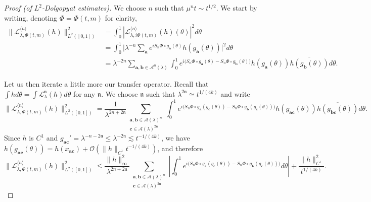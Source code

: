 \documentclass[11pt]{amsart}
\theoremstyle{plain}
\theoremstyle{definition}
\numberwithin{equation}{section}
\begin{document}
\begin{proof}[Proof (of $L^2$-Dolgopyat estimates)]
We choose $n$ such that $\mu^n t \sim t^{1/2}$. We start by writing, denoting $\Phi=\Phi(t,m)$ for clarity,
\begin{align*}
\Big\| \mathcal{L}_{\lambda,\Phi(t,m)}^{\langle n \rangle}(h) \Big\|_{L^2([0,1])}^2 &= \int_0^1 |\mathcal{L}_{\lambda,i\Phi(t,m)}^{\langle n \rangle}(h)(\theta)|^2 d\theta \\
&= \int_0^1 \Big| \lambda^{-n} \sum_{\mathbf{a}} e^{i S_n \Phi \circ g_{\mathbf{a}}(\theta)} h(g_\mathbf{a}(\theta)) \Big|^2 d\theta \\
&= \lambda^{-2n} \sum_{\mathbf{a},\mathbf{b} \in \mathcal{A}^n(\lambda)} \int_0^1 e^{i \big( S_n \Phi \circ g_\mathbf{a}(\theta) - S_n \Phi \circ g_\mathbf{b}(\theta) \big)} h(g_\mathbf{a}(\theta)) \overline{h(g_\mathbf{b}(\theta))} d\theta.
\end{align*}

Let us then iterate a little more our transfer operator. Recall that $\int h d\theta=\int \mathcal{L}_\lambda^{\mathfrak n}(h)d\theta$ for any $\mathfrak n$. We choose $\mathfrak n$ such that $\lambda^{2\mathfrak n}\simeq t^{1/(4k)}$ and write
$$
\Big\| \mathcal{L}_{\lambda,\Phi(t,m)}^{\langle n \rangle}(h) \Big\|_{L^2([0,1])}^2 = \frac{1}{\lambda^{2n+2\mathfrak n}} \sum_{\substack{\mathbf a,\mathbf b\in\mathcal A(\lambda)^n\\ \mathbf c\in\mathcal A(\lambda)^{2\mathfrak n}}} \int_0^1 e^{i \big( S_n \Phi \circ g_\mathbf{a}(g_\mathbf{c}(\theta)) - S_n \Phi \circ g_\mathbf{b}(g_\mathbf{c}(\theta)) \big)} h(g_\mathbf{ac}(\theta)) \overline{h(g_\mathbf{bc}(\theta))} d\theta.
$$
Since $h$ is $C^1$ and $g_{\mathbf{ac}}'=\lambda^{-n-2\mathfrak n}\leq\lambda^{-2\mathfrak n}\lesssim t^{-1/(4k)}$, we have $h(g_{\mathbf{ac}}(\theta))=h(x_{\mathbf{ac}})+\mathcal{O}(\|h\|_{C^1}t^{-1/(4k)})$, and therefore
$$
\Big\| \mathcal{L}_{\lambda,\Phi(t,m)}^{\langle n \rangle}(h) \Big\|_{L^2([0,1])}^2 \leq \frac{\|h\|_\infty^2}{\lambda^{2n+2\mathfrak n}} \sum_{\substack{\mathbf a,\mathbf b\in\mathcal A(\lambda)^n\\ \mathbf c\in\mathcal A(\lambda)^{2\mathfrak n}}} \left| \int_0^1 e^{i \big( S_n \Phi \circ g_\mathbf{a}(g_\mathbf{c}(\theta)) - S_n \Phi \circ g_\mathbf{b}(g_\mathbf{c}(\theta)) \big)} d\theta \right| + \frac{\|h\|_{C^1}^2}{t^{1/(4k)}}.
$$


\end{proof}
\end{document}
